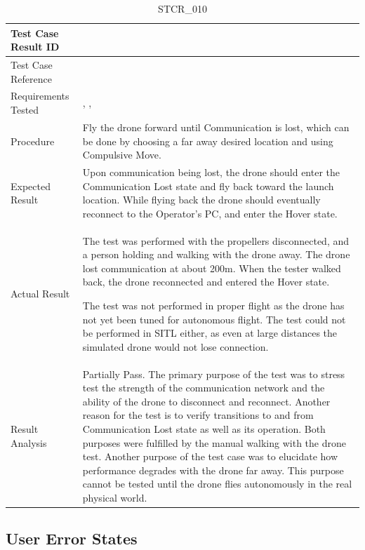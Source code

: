 \documentclass[12pt, titlepage]{article}
\begin{document}
\begin{table}[!h]
\begin{center}
\caption {STCR\_010}
\label{tab:STCR_010}
\begin{tabular}{ | m{3.2cm} | m{12.2cm} | } 
\hline
Test Case Result ID & \nameref{tab:STCR_010} \\ 
\hline
Test Case Reference & \nameref{tab:STC_010}  \\ 
\hline
Requirements Tested & \nameref{SR_007}, \nameref{STA_010}, \nameref{TRANS_010} \\

\hline
Procedure & Fly the drone forward until Communication is lost, which can be done by choosing a far away desired location and using Compulsive Move.   \\
\hline
Expected Result & Upon communication being lost, the drone should enter the Communication Lost state and fly back toward the launch location. While flying back the drone should eventually reconnect to the Operator's PC, and enter the Hover state.    \\ 
\hline
Actual Result & The test was performed with the propellers disconnected, and a person holding and walking with the drone away. The drone lost communication at about 200m. When the tester walked back, the drone reconnected and entered the Hover state. 

The test was not performed in proper flight as the drone has not yet been tuned for autonomous flight. The test could not be performed in SITL either, as even at large distances the simulated drone would not lose connection.  \\
\hline
Result Analysis & Partially Pass. The primary purpose of the test was to stress test the strength of the communication network and the ability of the drone to disconnect and reconnect. Another reason for the test is to verify transitions to and from Communication Lost state as well as its operation. Both purposes were fulfilled by the manual walking with the drone test. Another purpose of the test case was to elucidate how performance degrades with the drone far away. This purpose cannot be tested until the drone flies autonomously in the real physical world.  \\ 
\hline
\end{tabular}
\end{center}
\end{table}

\clearpage

\subsection{User Error States}
\end{document}
